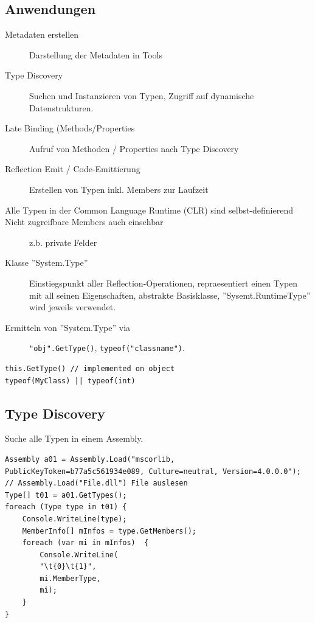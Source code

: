 \documentclass[
a4paper,
oneside,
10pt,
fleqn,
headsepline,
toc=listofnumbered, 
bibliography=totocnumbered]{scrartcl}
\begin{document}
\subsection{Anwendungen}
\begin{description}
    \item[Metadaten erstellen] Darstellung der Metadaten in Tools
    \item[Type Discovery] Suchen und Instanzieren von Typen, Zugriff auf dynamische Datenstrukturen.
    \item[Late Binding (Methods/Properties] Aufruf von Methoden / Properties nach Type Discovery
    \item[Reflection Emit / Code-Emittierung] Erstellen von Typen inkl. Members zur Laufzeit
    \item[Alle Typen in der Common Language Runtime (CLR) sind selbst-definierend]
    \item[Nicht zugreifbare Members auch einsehbar] z.b. private Felder
    \item[Klasse ''System.Type''] Einstiegspunkt aller Reflection-Operationen, repraesentiert einen Typen mit all seinen Eigenschaften, abstrakte Basisklasse, ''Sysemt.RuntimeType'' wird jeweils verwendet.
    \item[Ermitteln von ''System.Type'' via] \lstinline|"obj".GetType()|, \lstinline|typeof("classname")|.
\end{description}
\begin{lstlisting}
this.GetType() // implemented on object
typeof(MyClass) || typeof(int)
\end{lstlisting}

\subsection{Type Discovery}
Suche alle Typen in einem Assembly.
\begin{lstlisting}[caption=Reflection: Type Discovery]
Assembly a01 = Assembly.Load("mscorlib, PublicKeyToken=b77a5c561934e089, Culture=neutral, Version=4.0.0.0");
// Assembly.Load("File.dll") File auslesen
Type[] t01 = a01.GetTypes();
foreach (Type type in t01) {
	Console.WriteLine(type);
	MemberInfo[] mInfos = type.GetMembers();
	foreach (var mi in mInfos) 	{
		Console.WriteLine(
		"\t{0}\t{1}",
		mi.MemberType,
		mi);
	}
}
\end{lstlisting}
\end{document}
